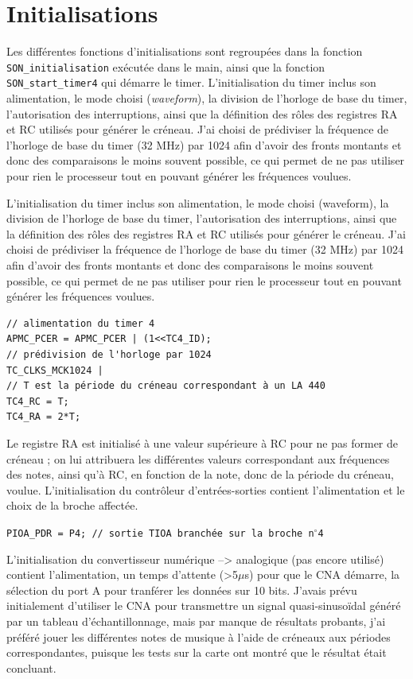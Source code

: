 \documentclass[a4paper]{report}
\begin{document}
\section{Initialisations}
Les différentes fonctions d'initialisations sont regroupées dans la fonction \texttt{SON\_initialisation} exécutée dans le main, ainsi que la fonction \texttt{SON\_start\_timer4} qui démarre le timer.
L'initialisation du timer inclus son alimentation, le mode choisi (\emph{waveform}), la division de l'horloge de base du timer, l'autorisation des interruptions, ainsi que la définition des rôles des registres RA et RC utilisés pour générer le créneau.
J'ai choisi de prédiviser la fréquence de l'horloge de base du timer (32 MHz) par 1024 afin d'avoir des fronts montants et donc des comparaisons le moins souvent possible, ce qui permet de ne pas utiliser pour rien le processeur tout en pouvant générer les fréquences voulues.

L'initialisation du timer inclus son alimentation, le mode choisi (waveform), la division de l'horloge de base du timer, l'autorisation des interruptions, ainsi que la définition des rôles des registres RA et RC utilisés pour générer le créneau.
J'ai choisi de prédiviser la fréquence de l'horloge de base du timer (32 MHz) par 1024 afin d'avoir des fronts montants et donc des comparaisons le moins souvent possible, ce qui permet de ne pas utiliser pour rien le processeur tout en pouvant générer les fréquences voulues.

\begin{verbatim}
// alimentation du timer 4
APMC_PCER = APMC_PCER | (1<<TC4_ID);
// prédivision de l'horloge par 1024
TC_CLKS_MCK1024 |
// T est la période du créneau correspondant à un LA 440
TC4_RC = T;
TC4_RA = 2*T;
\end{verbatim}

Le registre RA est initialisé à une valeur supérieure à RC pour ne pas former de créneau ;
on lui attribuera les différentes valeurs correspondant aux fréquences des notes, ainsi qu'à RC, en fonction de la note, donc de la période du créneau, voulue.
L'initialisation du contrôleur d'entrées-sorties contient l'alimentation et le choix de la broche affectée.

\texttt{PIOA\_PDR = P4; // sortie TIOA branchée sur la broche n$^\circ$4}

L'initialisation du convertisseur numérique –> analogique (pas encore utilisé) contient l'alimentation, un temps d'attente (>5$\mu$s) pour que le CNA démarre, la sélection du port A pour tranférer les données sur 10 bits.
J'avais prévu initialement d'utiliser le CNA pour transmettre un signal quasi-sinusoïdal généré par un tableau d'échantillonnage, mais par manque de résultats probants, j'ai préféré jouer les différentes notes de musique à l'aide de créneaux aux périodes correspondantes, puisque les tests sur la carte ont montré que le résultat était concluant.
\end{document}
